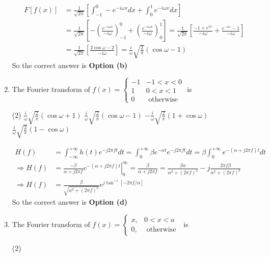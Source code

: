 \begin{enumerate}
\begin{answer}
\begin{align*}
	F[f(x)]&=\frac{1}{\sqrt{2 \pi}}\left[\int_{-1}^{0}-e^{-i \omega x} d x+\int_{0}^{1} e^{-i \omega x} d x\right]\\
	&=\frac{1}{\sqrt{2 \pi}}\left[-\left(\frac{e^{-i \omega x}}{-i \omega}\right)_{-1}^{0}+\left(\frac{e^{-i \omega x}}{-i \omega}\right)_{0}^{1}\right]=\frac{1}{\sqrt{2 \pi}}\left[\frac{-1+e^{i \omega}}{-i \omega}+\frac{e^{-i \omega}-1}{-i \omega}\right]\\
	&=\frac{1}{\sqrt{2 \pi}}\left[\frac{2 \cos \omega-2}{-i \omega}\right]=\frac{i}{\omega} \sqrt{\frac{2}{\pi}}(\cos \omega-1)
	\end{align*}
	So the correct answer is \textbf{Option (b)}
\end{answer}
	\item The Fourier transform of $f(x)=\left\{\begin{array}{cl}-1 & -1<x<0 \\ 1 & 0<x<1 \\ 0 & \text { otherwise }\end{array}\right.$ is
	\begin{tasks}(2)
		\task[\textbf{a.}] $\frac{i}{\omega} \sqrt{\frac{2}{\pi}}(\cos \omega+1)$
		\task[\textbf{b.}] $\frac{i}{\omega} \sqrt{\frac{2}{\pi}}(\cos \omega-1)$
		\task[\textbf{c.}]$-\frac{i}{\omega} \sqrt{\frac{2}{\pi}}(1+\cos \omega)$
		\task[\textbf{d.}] $\frac{i}{\omega} \sqrt{\frac{2}{\pi}}(1-\cos \omega)$
	\end{tasks}
	\begin{answer}
	\begin{align*}
	H(f)&=\int_{-\infty}^{+\infty} h(t) e^{-j 2 \pi f t} d t=\int_{0}^{+\infty} \beta e^{-\alpha t} e^{-j 2 \pi f t} d t=\beta \int_{0}^{+\infty} e^{-(\alpha+j 2 \pi f) t} d t\\
	\Rightarrow H(f)&=\left.\frac{-\beta}{\alpha+j 2 \pi f} e^{-(\alpha+j 2 \pi f) t}\right|_{0} ^{\infty}=\frac{\beta}{\alpha+j 2 \pi f}=\frac{\beta \alpha}{\alpha^{2}+(2 \pi f)^{2}}-j \frac{2 \pi f \beta}{\alpha^{2}+(2 \pi f)^{2}}\\
	\Rightarrow H(f)&=\frac{\beta}{\sqrt{\alpha^{2}+(2 \pi f)^{2}}} e^{j \tan ^{-1}[-2 \pi f / \alpha]}
	\end{align*}
	So the correct answer is \textbf{Option (d)}
\end{answer}
	\item The Fourier transform of $f(x)= \begin{cases}x, & 0<x<a \\ 0, & \text { otherwise }\end{cases}$ is
	\begin{tasks}(2)

\end{tasks}
\end{enumerate}
